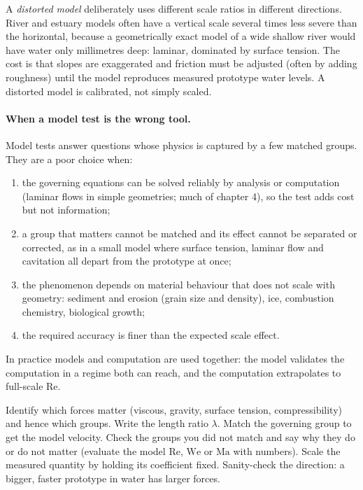 A \emph{distorted model} deliberately uses different scale ratios in different directions. River and estuary models often have a vertical scale several times less severe than the horizontal, because a geometrically exact model of a wide shallow river would have water only millimetres deep: laminar, dominated by surface tension. The cost is that slopes are exaggerated and friction must be adjusted (often by adding roughness) until the model reproduces measured prototype water levels. A distorted model is calibrated, not simply scaled.

\paragraph{When a model test is the wrong tool.} Model tests answer questions whose physics is captured by a few matched groups. They are a poor choice when:
\begin{enumerate}[nosep,leftmargin=*]
\item the governing equations can be solved reliably by analysis or computation (laminar flows in simple geometries; much of chapter 4), so the test adds cost but not information;
\item a group that matters cannot be matched and its effect cannot be separated or corrected, as in a small model where surface tension, laminar flow and cavitation all depart from the prototype at once;
\item the phenomenon depends on material behaviour that does not scale with geometry: sediment and erosion (grain size and density), ice, combustion chemistry, biological growth;
\item the required accuracy is finer than the expected scale effect.
\end{enumerate}
In practice models and computation are used together: the model validates the computation in a regime both can reach, and the computation extrapolates to full-scale $\mathrm{Re}$.

\begin{firstmoves}
Identify which forces matter (viscous, gravity, surface tension, compressibility) and hence which groups. Write the length ratio $\lambda$. Match the governing group to get the model velocity. Check the groups you did not match and say why they do or do not matter (evaluate the model $\mathrm{Re}$, $\mathrm{We}$ or $\mathrm{Ma}$ with numbers). Scale the measured quantity by holding its coefficient fixed. Sanity-check the direction: a bigger, faster prototype in water has larger forces.
\end{firstmoves}

